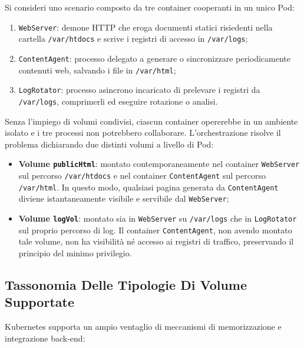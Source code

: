 \documentclass[11pt, a4paper]{article}
\begin{document}

Si consideri uno scenario composto da tre container cooperanti in un unico Pod:
\begin{enumerate}[noitemsep]
    \item \texttt{WebServer}: demone HTTP che eroga documenti statici risiedenti nella cartella \texttt{/var/htdocs} e scrive i registri di accesso in \texttt{/var/logs};
    \item \texttt{ContentAgent}: processo delegato a generare o sincronizzare periodicamente contenuti web, salvando i file in \texttt{/var/html};
    \item \texttt{LogRotator}: processo asincrono incaricato di prelevare i registri da \texttt{/var/logs}, comprimerli ed eseguire rotazione o analisi.
\end{enumerate}

Senza l'impiego di volumi condivisi, ciascun container opererebbe in un ambiente isolato e i tre processi non potrebbero collaborare. L'orchestrazione risolve il problema dichiarando due distinti volumi a livello di Pod:
\begin{itemize}[noitemsep]
    \item \textbf{Volume \texttt{publicHtml}}: montato contemporaneamente nel container \texttt{WebServer} sul percorso \texttt{/var/htdocs} e nel container \texttt{ContentAgent} sul percorso \texttt{/var/html}. In questo modo, qualsiasi pagina generata da \texttt{ContentAgent} diviene istantaneamente visibile e servibile dal \texttt{WebServer};
    \item \textbf{Volume \texttt{logVol}}: montato sia in \texttt{WebServer} su \texttt{/var/logs} che in \texttt{LogRotator} sul proprio percorso di log. Il container \texttt{ContentAgent}, non avendo montato tale volume, non ha visibilità né accesso ai registri di traffico, preservando il principio del minimo privilegio.
\end{itemize}

\subsection{Tassonomia Delle Tipologie Di Volume Supportate}
Kubernetes supporta un ampio ventaglio di meccanismi di memorizzazione e integrazione back-end:
\end{document}
